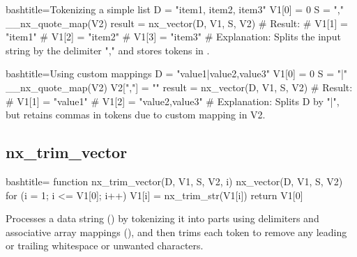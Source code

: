 \begin{NexCodeBox}{bash}{title={Tokenizing a simple list}}
	D = "item1, item2, item3"
	V1[0] = 0
	S = ","
	__nx_quote_map(V2)
	result = nx_vector(D, V1, S, V2)
	# Result:
	# V1[1] = "item1"
	# V1[2] = "item2"
	# V1[3] = "item3"
	# Explanation: Splits the input string by the delimiter "," and stores tokens in .
\end{NexCodeBox}

\begin{NexCodeBox}{bash}{title={Using custom mappings}}
	D = "value1|value2,value3"
	V1[0] = 0
	S = "|"
	__nx_quote_map(V2)
	V2[","] = ""
	result = nx_vector(D, V1, S, V2)
	# Result:
	# V1[1] = "value1"
	# V1[2] = "value2,value3"
	# Explanation: Splits D by "|", but retains commas in tokens due to custom mapping in V2.
\end{NexCodeBox}

\newpage
\subsection{nx_trim_vector}
\label{nx_trim_vector}
\begin{NexCodeBox}{bash}{title={}}
function nx_trim_vector(D, V1, S, V2,   i)
{
	nx_vector(D, V1, S, V2)
	for (i = 1; i <= V1[0]; i++)
		V1[i] = nx_trim_str(V1[i])
	return V1[0]
}
\end{NexCodeBox}

\begin{NexMainBox}
	\begin{NexMainBox}
		Processes a data string () by tokenizing it into parts using delimiters and associative array mappings (), and then trims each token to remove any leading or trailing whitespace or unwanted characters.
	\end{NexMainBox}
	\begin{NexMainBox}
		\begin{NexListDark}
		\end{NexListDark}
	\end{NexMainBox}
\end{NexMainBox}

